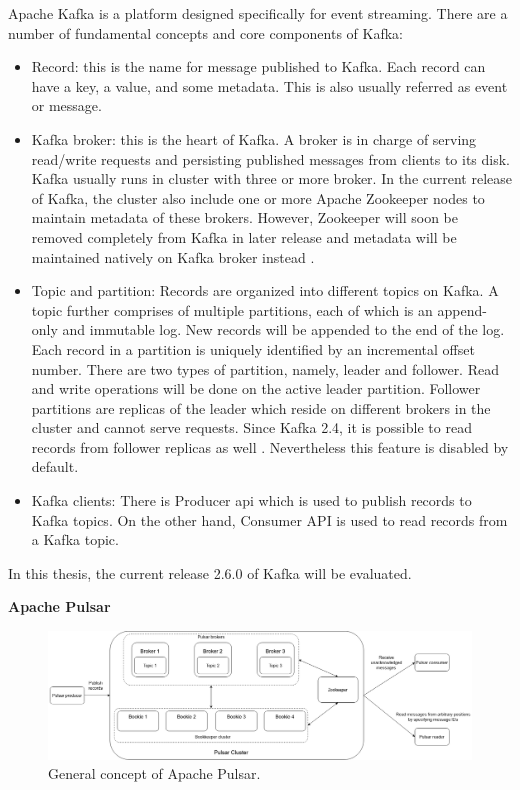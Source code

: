 Apache Kafka is a platform designed specifically for event streaming. There are a number of fundamental concepts and core components of Kafka:
\begin{itemize}
	\item Record: this is the name for message published to Kafka. Each record can have a key, a value, and some metadata. This is also usually referred as event or message.
	\item Kafka broker: this is the heart of Kafka. A broker is in charge of serving read/write requests and persisting published messages from clients to its disk. Kafka usually runs in cluster with three or more broker. In the current release of Kafka, the cluster also include one or more Apache Zookeeper \cite{apachezookeeper} nodes to maintain metadata of these brokers. However, Zookeeper will soon be removed completely from Kafka in later release and metadata will be maintained natively on Kafka broker instead \cite{kafkaremovezookeeper}.
	\item Topic and partition: Records are organized into different topics on Kafka. A topic further comprises of multiple partitions, each of which is an append-only and immutable log. New records will be appended to the end of the log. Each record in a partition is uniquely identified by an incremental offset number. There are two types of partition, namely, leader and follower. Read and write operations will be done on the active leader partition. Follower partitions are replicas of the leader which reside on different brokers in the cluster and cannot serve requests. Since Kafka 2.4, it is possible to read records from follower replicas as well \cite{kafkareadfromfollower}. Nevertheless this feature is disabled by default.
	\item Kafka clients: There is Producer \acrshort{api} which is used to publish records to Kafka topics. On the other hand, Consumer API is used to read records from a Kafka topic. 
\end{itemize}

In this thesis, the current release 2.6.0 of Kafka will be evaluated.

\textbf{Apache Pulsar}

\begin{figure}[h]
	\includegraphics[width=\linewidth]{images/general-pulsar.png}
	\caption{General concept of Apache Pulsar.}
	\label{fig:pulsargeneral}
\end{figure}

